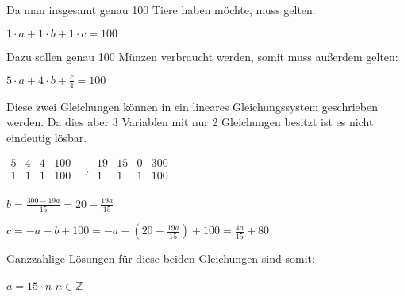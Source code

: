 \documentclass[../main.tex]{subfiles}
\begin{document}
\begin{enumerate}
\begin{enumerate}
			  Da man insgesamt genau 100 Tiere haben möchte, muss gelten:
					
		            \begin{math}
			            1 \cdot a + 1 \cdot b + 1 \cdot c = 100
		            \end{math}

		            Dazu sollen genau 100 Münzen verbraucht werden, somit muss außerdem gelten:

		            \begin{math}
			            5 \cdot a + 4 \cdot b + \frac{c}{4} = 100
		            \end{math}

		            Diese zwei Gleichungen können in ein lineares Gleichungssystem geschrieben werden.
		            Da dies aber 3 Variablen mit nur 2 Gleichungen besitzt ist es nicht eindeutig lösbar.

		            \begin{math}
			            \begin{array}{ccc|c}
				            5 & 4 & 4 & 100 \\
				            1 & 1 & 1 & 100 \\
			            \end{array}
			            \rightarrow
			            \begin{array}{ccc|c}
				            19 & 15 & 0 & 300 \\
				            1  & 1  & 1 & 100 \\
			            \end{array}
		            \end{math}

		            \begin{math}
			            b = \frac{300 - 19a}{15}
			            = 20 - \frac{19a}{15}
		            \end{math}

		            \begin{math}
						c = - a - b + 100
						= - a - (20 - \frac{19a}{15}) + 100 = \frac{4a}{15} + 80
					\end{math}
					
					Ganzzahlige Lösungen für diese beiden Gleichungen sind somit:

					\begin{math}
						a = 15 \cdot n 
					\end{math} \begin{math}
						n \in \mathbb{Z}
					\end{math}


\end{enumerate}
\end{enumerate}
\end{document}
